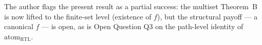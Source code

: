 \documentclass[11pt]{article}
\theoremstyle{definition}
\begin{document}
\medskip\noindent
The author flags the present result as a partial success: the multiset Theorem~B is now lifted to the finite-set level (existence of $f$), but the structural payoff --- a canonical $f$ --- is open, as is Open Question Q3 on the path-level identity of $\mathrm{atom}_{\mathrm{RTL}}$.
\end{document}
